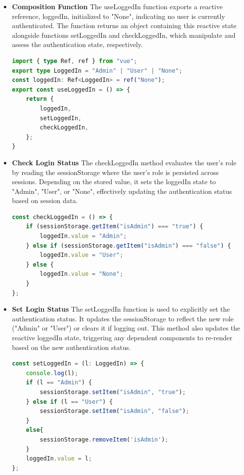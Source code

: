 \begin{itemize}
\item \textbf{Composition Function}
The useLoggedIn function exports a reactive reference, loggedIn, initialized to "None", indicating no user is currently authenticated. The function returns an object containing this reactive state alongside functions setLoggedIn and checkLoggedIn, which manipulate and assess the authentication state, respectively.
\begin{lstlisting}[language=TypeScript]
import { type Ref, ref } from "vue";
export type LoggedIn = "Admin" | "User" | "None";
const loggedIn: Ref<LoggedIn> = ref("None");
export const useLoggedIn = () => {
    return {
        loggedIn,
        setLoggedIn,
        checkLoggedIn,
    };
}
\end{lstlisting}
\item \textbf{Check Login Status}
The checkLoggedIn method evaluates the user's role by reading the sessionStorage where the user's role is persisted across sessions. Depending on the stored value, it sets the loggedIn state to "Admin", "User", or "None", effectively updating the authentication status based on session data.

\begin{lstlisting}[language=TypeScript]
const checkLoggedIn = () => {
    if (sessionStorage.getItem("isAdmin") === "true") {
        loggedIn.value = "Admin";
    } else if (sessionStorage.getItem("isAdmin") === "false") {
        loggedIn.value = "User";
    } else {
        loggedIn.value = "None";
    }
};
\end{lstlisting}
\item \textbf{Set Login Status}
The setLoggedIn function is used to explicitly set the authentication status. It updates the sessionStorage to reflect the new role ("Admin" or "User") or clears it if logging out. This method also updates the reactive loggedIn state, triggering any dependent components to re-render based on the new authentication status.

\begin{lstlisting}[language=TypeScript]
const setLoggedIn = (l: LoggedIn) => {
    console.log(l);
    if (l == "Admin") {
        sessionStorage.setItem("isAdmin", "true");
    } else if (l == "User") {
        sessionStorage.setItem("isAdmin", "false");
    }
    else{
        sessionStorage.removeItem('isAdmin');
    }
    loggedIn.value = l;
};
\end{lstlisting}
\end{itemize}

